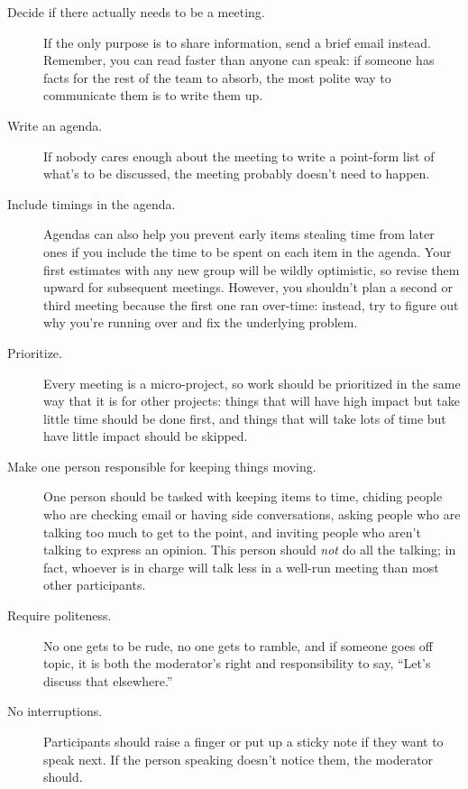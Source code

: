 \begin{description}

\item[Decide if there actually needs to be a meeting.]
  If the only purpose is to share information,
  send a brief email instead.
  Remember,
  you can read faster than anyone can speak:
  if someone has facts for the rest of the team to absorb,
  the most polite way to communicate them is to write them up.

\item[Write an agenda.]
  If nobody cares enough about the meeting to write a point-form list
  of what's to be discussed,
  the meeting probably doesn't need to happen.

\item[Include timings in the agenda.]
  Agendas can also help you prevent early items stealing time from later ones
  if you include the time to be spent on each item in the agenda.
  Your first estimates with any new group will be wildly optimistic,
  so revise them upward for subsequent meetings.
  However,
  you shouldn't plan a second or third meeting
  because the first one ran over-time:
  instead,
  try to figure out why you're running over and fix the underlying problem.

\item[Prioritize.]
  Every meeting is a micro-project,
  so work should be prioritized in the same way that it is for other projects:
  things that will have high impact but take little time should be done first,
  and things that will take lots of time but have little impact should be skipped.

\item[Make one person responsible for keeping things moving.]
  One person should be tasked with keeping items to time,
  chiding people who are checking email or  having side conversations,
  asking people who are talking too much to get to the point,
  and inviting people who aren't talking to express an opinion.
  This person should \emph{not} do all the talking;
  in fact,
  whoever is in charge will talk less in a well-run meeting
  than most other participants.

\item[Require politeness.]
  No one gets to be rude,
  no one gets to ramble,
  and if someone goes off topic,
  it is both the moderator's right and responsibility to say,
  ``Let's discuss that elsewhere.''

\item[No interruptions.]
  Participants should raise a finger or put up a sticky note
  if they want to speak next.
  If the person speaking doesn't notice them,
  the moderator should.


\end{description}
